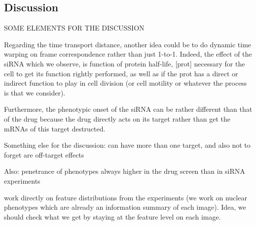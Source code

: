 \subsection{Discussion}
SOME ELEMENTS FOR THE DISCUSSION

Regarding the time transport distance, another idea could be to do dynamic time warping on frame correspondence rather than just 1-to-1. Indeed, the effect of the siRNA which we observe, is function of protein half-life, [prot] necessary for the cell to get its function rightly performed, as well as  if the prot has a direct or indirect function to play in cell division (or cell motility or whatever the process is that we consider).

Furthermore, the phenotypic onset of the siRNA can be rather different than that of the drug because the drug directly acts on its target rather than get the mRNAs of this target destructed.

Something else for the discussion: can have more than one target, and also not to forget are off-target effects

Also: penetrance of phenotypes always higher in the drug screen than in siRNA experiments

\cite{pmid18066055} work directly on feature distributions from the experiments (we work on nuclear phenotypes which are already an information summary of each image). Idea, we should check what we get by staying at the feature level on each image.